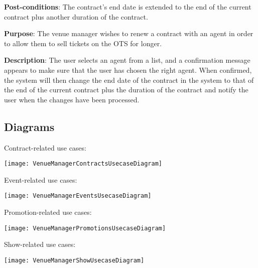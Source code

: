\textbf{Post-conditions}: The contract's end date is extended to the
end of the current contract plus another duration of the contract.

\textbf{Purpose}: The venue manager wishes to renew a contract with
an agent in order to allow them to sell tickets on the OTS for longer.

\textbf{Description}: The user selects an agent from a list,
and a confirmation message appears to make sure that the user
has chosen the right agent. When confirmed, the system will
then change the end date of the contract in the system to that
of the end of the current contract plus the duration of the
contract and notify the user when the changes have been processed.

\subsection{Diagrams}
Contract-related use cases:

\texttt{[image: VenueManagerContractsUsecaseDiagram]}

Event-related use cases:

\texttt{[image: VenueManagerEventsUsecaseDiagram]}

Promotion-related use cases:

\texttt{[image: VenueManagerPromotionsUsecaseDiagram]}

Show-related use cases:

\texttt{[image: VenueManagerShowUsecaseDiagram]}
